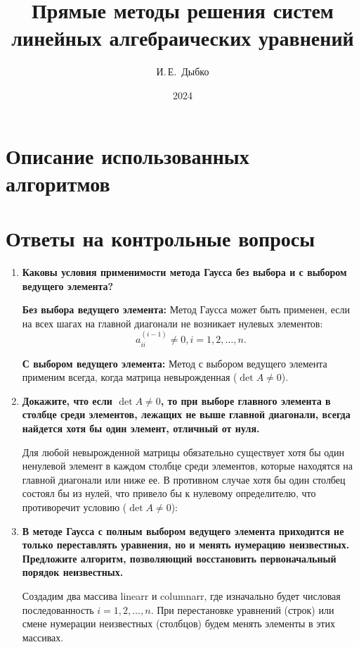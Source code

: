 \documentclass[12pt, a4paper]{article}
\title{Прямые методы решения систем
	линейных алгебраических уравнений}
\author{И.\,Е.~Дыбко}
\date{2024}
\begin{document}
	
	\maketitle
	
	\tableofcontents
	\section{Описание использованных алгоритмов}
	\section{Ответы на контрольные вопросы}
	
	\begin{enumerate}
	\item \textbf{Каковы условия применимости метода Гаусса без выбора
	и с выбором ведущего элемента?}
	
		\textbf{Без выбора ведущего элемента:} Метод Гаусса может быть применен, если на всех шагах на главной диагонали не возникает нулевых элементов: $$a^{(i-1)}_{ii}\ne 0, i = 1,2,\ldots,n.$$

		 \textbf {С выбором ведущего элемента:} Метод с выбором ведущего элемента  применим всегда, когда матрица невырожденная ($\det A \ne 0$).
		 
	\item \textbf{Докажите, что если $\det A \ne 0$, то при выборе главного
	элемента в столбце среди элементов, лежащих не выше главной диагонали, всегда найдется хотя бы один элемент, отличный от нуля.}
	
		 Для любой невырожденной матрицы обязательно существует хотя бы один ненулевой элемент в каждом столбце среди элементов, которые находятся на главной диагонали или ниже ее. В противном случае хотя бы один столбец состоял бы из нулей, что привело бы к нулевому определителю, что противоречит условию ($\det A \ne 0$):
	

	\item \textbf{В методе Гаусса с полным выбором ведущего элемента приходится не только переставлять уравнения, но и менять нумерацию неизвестных. Предложите алгоритм, позволяющий восстановить первоначальный порядок неизвестных.}
	
	Создадим два массива linearr и columnarr, где изначально будет числовая последованность $i=1,2,\ldots,n$. При перестановке уравнений (строк) или смене нумерации неизвестных (столбцов) будем менять элементы в этих массивах. 
	
	
	

\end{enumerate}
\end{document}
